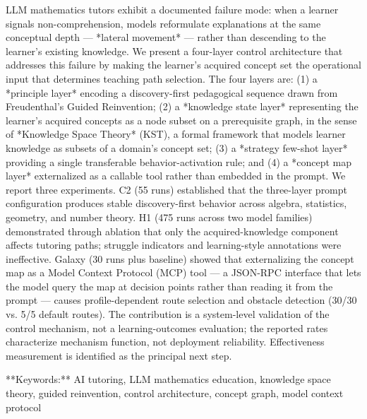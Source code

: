 LLM mathematics tutors exhibit a documented failure mode: when a learner signals non-comprehension, models reformulate explanations at the same conceptual depth — *lateral movement* — rather than descending to the learner's existing knowledge. We present a four-layer control architecture that addresses this failure by making the learner's acquired concept set the operational input that determines teaching path selection. The four layers are: (1) a *principle layer* encoding a discovery-first pedagogical sequence drawn from Freudenthal's Guided Reinvention; (2) a *knowledge state layer* representing the learner's acquired concepts as a node subset on a prerequisite graph, in the sense of *Knowledge Space Theory* (KST), a formal framework that models learner knowledge as subsets of a domain's concept set; (3) a *strategy few-shot layer* providing a single transferable behavior-activation rule; and (4) a *concept map layer* externalized as a callable tool rather than embedded in the prompt. We report three experiments. C2 (55 runs) established that the three-layer prompt configuration produces stable discovery-first behavior across algebra, statistics, geometry, and number theory. H1 (475 runs across two model families) demonstrated through ablation that only the acquired-knowledge component affects tutoring paths; struggle indicators and learning-style annotations were ineffective. Galaxy (30 runs plus baseline) showed that externalizing the concept map as a Model Context Protocol (MCP) tool — a JSON-RPC interface that lets the model query the map at decision points rather than reading it from the prompt — causes profile-dependent route selection and obstacle detection (30/30 vs. 5/5 default routes). The contribution is a system-level validation of the control mechanism, not a learning-outcomes evaluation; the reported rates characterize mechanism function, not deployment reliability. Effectiveness measurement is identified as the principal next step.

**Keywords:** AI tutoring, LLM mathematics education, knowledge space theory, guided reinvention, control architecture, concept graph, model context protocol